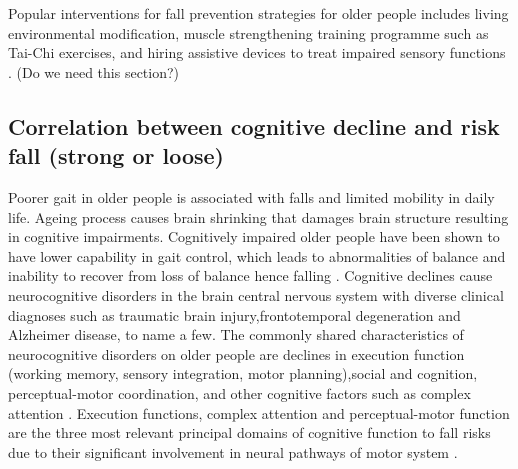 \documentclass[conference,compsoc]{IEEEtran}
\begin{document}
Popular interventions for fall prevention strategies for older people includes living environmental modification, muscle strengthening training programme such as Tai-Chi exercises, and hiring assistive devices to treat impaired sensory functions \cite{who_2012}. (Do we need this section?)

\subsection{Correlation between cognitive decline and risk fall (strong or loose)}
\begin{comment}
\textcolor{blue}{Executive function is the cognitive domain most commonly associated with gait dysfunction. Attention, sensory integration, and motor planning
are the sub-domains of executive function associated with risk of falls through gait dysfunction, whereas cognitive flexibility, judgement, and inhibitory control affect risk of falls through risk-taking behaviour\cite{Zhang_2019}}

\textcolor{blue}{Common tests of general sensori-motor function and balance in community-dwelling older adults include postural sway assessments, limit of stability tests, gait function (e.g. speed and variability), timed-up-and-go test (TUG), Berg Balance Scale, Tinetti Test and the physiological profile assessment (PPA). \cite{Carty_2014}}
\end{comment}

Poorer gait in older people is associated with falls and limited mobility in daily life. Ageing process causes brain shrinking that damages brain structure resulting in cognitive impairments. Cognitively impaired older people have been shown to have lower capability in gait control, which leads to abnormalities of balance and inability to recover from loss of balance \cite{Thelen_1997} hence falling \cite{Martin_2012, Carty_2014}. Cognitive declines cause neurocognitive disorders in the brain central nervous system with diverse clinical diagnoses such as traumatic brain injury,frontotemporal degeneration and Alzheimer disease, to name a few. The commonly shared characteristics of neurocognitive disorders on older people are declines in execution function (working memory,  sensory integration, motor planning),social and cognition, perceptual-motor coordination, and other cognitive factors such as complex attention \cite{Sachdev_2014}. Execution functions, complex attention and perceptual-motor function are the three most relevant principal domains of cognitive function to fall risks due to their significant involvement in neural pathways of motor system \cite{Zhang_2019}. 
\end{document}
